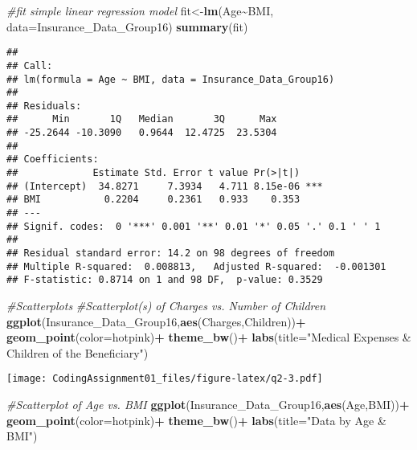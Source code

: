 \documentclass[
]{article}
\newenvironment{Shaded}{\begin{snugshade}}{\end{snugshade}}
\newcommand{\AttributeTok}[1]{\textcolor[rgb]{0.13,0.29,0.53}{#1}}
\newcommand{\CommentTok}[1]{\textcolor[rgb]{0.56,0.35,0.01}{\textit{#1}}}
\newcommand{\FunctionTok}[1]{\textcolor[rgb]{0.13,0.29,0.53}{\textbf{#1}}}
\newcommand{\NormalTok}[1]{#1}
\newcommand{\OtherTok}[1]{\textcolor[rgb]{0.56,0.35,0.01}{#1}}
\newcommand{\SpecialCharTok}[1]{\textcolor[rgb]{0.81,0.36,0.00}{\textbf{#1}}}
\newcommand{\StringTok}[1]{\textcolor[rgb]{0.31,0.60,0.02}{#1}}
\begin{document}
\begin{Shaded}
\begin{Highlighting}[]
\CommentTok{\#fit simple linear regression model}
\NormalTok{fit}\OtherTok{\textless{}{-}}\FunctionTok{lm}\NormalTok{(Age}\SpecialCharTok{\textasciitilde{}}\NormalTok{BMI, }\AttributeTok{data=}\NormalTok{Insurance\_Data\_Group16)}
\FunctionTok{summary}\NormalTok{(fit)}
\end{Highlighting}
\end{Shaded}

\begin{verbatim}
## 
## Call:
## lm(formula = Age ~ BMI, data = Insurance_Data_Group16)
## 
## Residuals:
##      Min       1Q   Median       3Q      Max 
## -25.2644 -10.3090   0.9644  12.4725  23.5304 
## 
## Coefficients:
##             Estimate Std. Error t value Pr(>|t|)    
## (Intercept)  34.8271     7.3934   4.711 8.15e-06 ***
## BMI           0.2204     0.2361   0.933    0.353    
## ---
## Signif. codes:  0 '***' 0.001 '**' 0.01 '*' 0.05 '.' 0.1 ' ' 1
## 
## Residual standard error: 14.2 on 98 degrees of freedom
## Multiple R-squared:  0.008813,   Adjusted R-squared:  -0.001301 
## F-statistic: 0.8714 on 1 and 98 DF,  p-value: 0.3529
\end{verbatim}

\begin{Shaded}
\begin{Highlighting}[]
\CommentTok{\#Scatterplots}
\CommentTok{\#Scatterplot(s) of Charges vs. Number of Children}
\FunctionTok{ggplot}\NormalTok{(Insurance\_Data\_Group16,}\FunctionTok{aes}\NormalTok{(Charges,Children))}\SpecialCharTok{+}
  \FunctionTok{geom\_point}\NormalTok{(}\AttributeTok{color=}\StringTok{\textquotesingle{}hotpink\textquotesingle{}}\NormalTok{)}\SpecialCharTok{+}
  \FunctionTok{theme\_bw}\NormalTok{()}\SpecialCharTok{+}
  \FunctionTok{labs}\NormalTok{(}\AttributeTok{title=}\StringTok{"Medical Expenses \& Children of the Beneficiary"}\NormalTok{)}
\end{Highlighting}
\end{Shaded}

\texttt{[image: CodingAssignment01\_files/figure-latex/q2-3.pdf]}

\begin{Shaded}
\begin{Highlighting}[]
\CommentTok{\#Scatterplot of Age vs. BMI}
\FunctionTok{ggplot}\NormalTok{(Insurance\_Data\_Group16,}\FunctionTok{aes}\NormalTok{(Age,BMI))}\SpecialCharTok{+}
  \FunctionTok{geom\_point}\NormalTok{(}\AttributeTok{color=}\StringTok{\textquotesingle{}hotpink\textquotesingle{}}\NormalTok{)}\SpecialCharTok{+}
  \FunctionTok{theme\_bw}\NormalTok{()}\SpecialCharTok{+}
  \FunctionTok{labs}\NormalTok{(}\AttributeTok{title=}\StringTok{"Data by Age \& BMI"}\NormalTok{)}
\end{Highlighting}
\end{Shaded}
\end{document}
